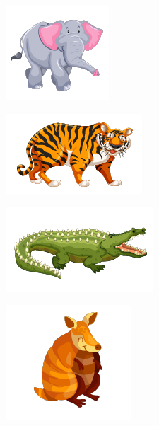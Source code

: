 \begin{multicols}{2}
\begin{escolha}
\item \includegraphics[width=.5\textwidth]{./media/SAEB_1ANO_MAT_FIGURA131a.png}
\item \includegraphics[width=.5\textwidth]{./media/SAEB_1ANO_MAT_FIGURA131b.png}

\columnbreak

\item \includegraphics[width=.5\textwidth]{./media/SAEB_1ANO_MAT_FIGURA131c.png}
\item \includegraphics[width=.5\textwidth]{./media/SAEB_1ANO_MAT_FIGURA131d.png}
\end{escolha}
\end{multicols}

